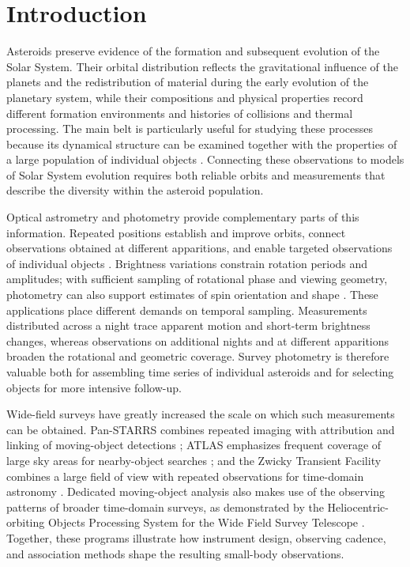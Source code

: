 \section{Introduction}
\label{sec:introduction}

Asteroids preserve evidence of the formation and subsequent evolution of
the Solar System. Their orbital distribution reflects the gravitational
influence of the planets and the redistribution of material during the
early evolution of the planetary system, while their compositions and
physical properties record different formation environments and histories
of collisions and thermal processing. The main belt is particularly useful
for studying these processes because its dynamical structure can be
examined together with the properties of a large population of individual
objects \citep{DeMeoCarry2014,Morbidelli2015Belt}. Connecting these
observations to models of Solar System evolution requires both reliable
orbits and measurements that describe the diversity within the asteroid
population.

Optical astrometry and photometry provide complementary parts of this
information. Repeated positions establish and improve orbits, connect
observations obtained at different apparitions, and enable targeted
observations of individual objects \citep{Jedicke2015Surveys}. Brightness
variations constrain rotation periods and amplitudes; with sufficient
sampling of rotational phase and viewing geometry, photometry can also
support estimates of spin orientation and shape
\citep{WarnerHarrisPravec2009,Durech2015Models}. These applications place
different demands on temporal sampling. Measurements distributed across a
night trace apparent motion and short-term brightness changes, whereas
observations on additional nights and at different apparitions broaden
the rotational and geometric coverage. Survey photometry is therefore
valuable both for assembling time series of individual asteroids and for
selecting objects for more intensive follow-up.

Wide-field surveys have greatly increased the scale on which such
measurements can be obtained. Pan-STARRS combines repeated imaging with
attribution and linking of moving-object detections
\citep{Denneau2013}; ATLAS emphasizes frequent coverage of large sky areas
for nearby-object searches \citep{Tonry2018}; and the Zwicky Transient
Facility combines a large field of view with repeated observations for
time-domain astronomy \citep{Bellm2019}. Dedicated moving-object analysis
also makes use of the observing patterns of broader time-domain surveys,
as demonstrated by the Heliocentric-orbiting Objects Processing System for
the Wide Field Survey Telescope \citep{Wang2025HOPS}. Together, these
programs illustrate how instrument design, observing cadence, and
association methods shape the resulting small-body observations.

